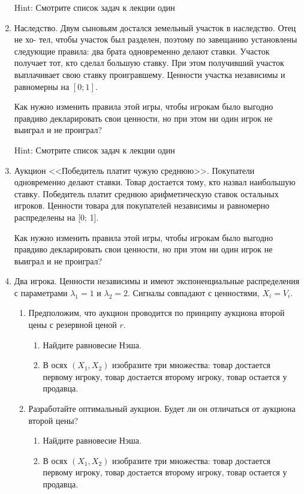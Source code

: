 \begin{enumerate}
Hint: Смотрите список задач к лекции один

\item Наследство. Двум сыновьям достался земельный участок в наследство. Отец не хо-
тел, чтобы участок был разделен, поэтому по завещанию установлены следующие правила: два брата одновременно делают ставки. Участок получает тот, кто сделал большую ставку. При этом получивший участок выплачивает свою ставку проигравшему.
Ценности участка независимы и равномерны на $[0; 1]$.

Как нужно изменить правила этой игры, чтобы игрокам было выгодно правдиво декларировать свои ценности, но при этом ни один игрок не выиграл и не проиграл?

Hint: Смотрите список задач к лекции один

\item Аукцион <<Победитель платит чужую среднюю>>. Покупатели одновременно делают
ставки. Товар достается тому, кто назвал наибольшую ставку. Победитель платит
среднюю арифметическую ставок остальных игроков. Ценности товара для покупателей независимы и равномерно распределены на [0; 1]. 

Как нужно изменить правила этой игры, чтобы игрокам было выгодно правдиво декларировать свои ценности, но при этом ни один игрок не выиграл и не проиграл?

\item Два игрока. Ценности независимы и имеют экспоненциальные распределения с параметрами $ \lambda_{1}=1 $ и $\lambda_{2}=2  $. Сигналы совпадают с ценностями,  $ X_{i}=V_{i} $. 

\begin{enumerate}
\item Предположим, что аукцион проводится по принципу аукциона второй цены с резервной ценой $ r $. 
\begin{enumerate}
\item Найдите равновесие Нэша.
\item В осях $ (X_{1},X_{2}) $ изобразите три множества: товар достается первому игроку, товар достается второму игроку, товар остается у продавца.
\end{enumerate}
\item Разработайте оптимальный аукцион. Будет ли он отличаться от аукциона второй цены?
\begin{enumerate}
\item Найдите равновесие Нэша.
\item В осях $ (X_{1},X_{2}) $ изобразите три множества: товар достается первому игроку, товар достается второму игроку, товар остается у продавца.
\end{enumerate} 
\end{enumerate} 


\end{enumerate}
